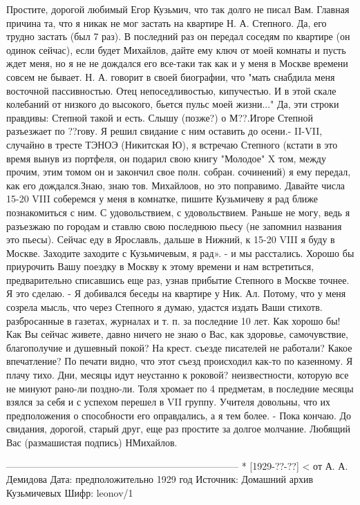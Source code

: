 Простите, дорогой любимый Егор Кузьмич, что так долго не писал Вам. Главная причина та, что я никак не мог застать на квартире Н. А. Степного.
Да, его трудно застать (был 7 раз). В последний раз он передал соседям по квартире (он одинок сейчас), если будет Михайлов, дайте ему ключ от моей комнаты и пусть ждет меня, но я не не дождался его все-таки так как и у меня в Москве времени совсем не бывает. Н. А. говорит в своей биографии, что "мать снабдила меня восточной пассивностью. Отец непоседливостью, кипучестью. И в этой скале колебаний от низкого до высокого, бьется пульс моей жизни..."
Да, эти строки правдивы: Степной такой и есть.
Слышу (позже?) о М??.Игоре Степной разъезжает по ??гову. Я решил свидание с ним оставить до осени.-
II-VII, случайно в тресте ТЭНОЭ (Никитская Ю), я встречаю Степного (кстати в это время вынув из портфеля, он подарил свою книгу "Молодое" X том, между прочим, этим томом он и закончил свое полн. собран. сочинений) я ему передал, как его дождался.Знаю, знаю тов. Михайлоов, но это поправимо.
Давайте числа 15-20 VIII соберемся у меня в комнатке, пишите Кузьмичеву я рад ближе познакомиться с ним.
С удовольствием, с удовольствием. Раньше не могу, ведь я разъезжаю по городам и ставлю свою последнюю пьесу (не запомнил названия это пьесы). Сейчас еду в Ярославль, дальше в Нижний, к 15-20 VIII я буду в Москве. Заходите заходите с Кузьмичевым, я рад». - и мы расстались.
Хорошо бы приурочить Вашу поездку в Москву к этому времени и нам встретиться, предварительно списавшись еще раз, узнав прибытие Степного в Москве точнее.  Я это сделаю. - Я добивался беседы на квартире у Ник. Ал. Потому, что у меня созрела мысль, что через Степного я думаю, удастся издать Ваши стихотв. разбросанные в газетах, журналах и т. п. за последние 10 лет. 
Как хорошо бы!
Как Вы сейчас живете, давно ничего не знаю о Вас, как здоровье, самочувствие, благополучие и душевный покой?
На крест. съезде писателей не работали? Какое впечатление? По печати видно, что этот съезд происходил как-то по казенному. Я плачу тихо. Дни, месяцы идут неустанно к роковой? неизвестности, которую все не минуют рано-ли поздно-ли.
Толя хромает по 4 предметам, в последние месяцы взялся за себя и с успехом перешел в VII группу. Учителя довольны, что их предположения о способности его оправдались, а я тем более. -  Пока кончаю.
До свидания, дорогой, старый друг, еще раз простите за долгое молчание.
Любящий Вас  (размашистая подпись) НМихайлов.

------------------------------------------------------------------------
* [1929-??-??] < от А. А. Демидова
Дата: предположительно 1929 год
Источник: Домашний архив Кузьмичевых
Шифр: leonov/1

